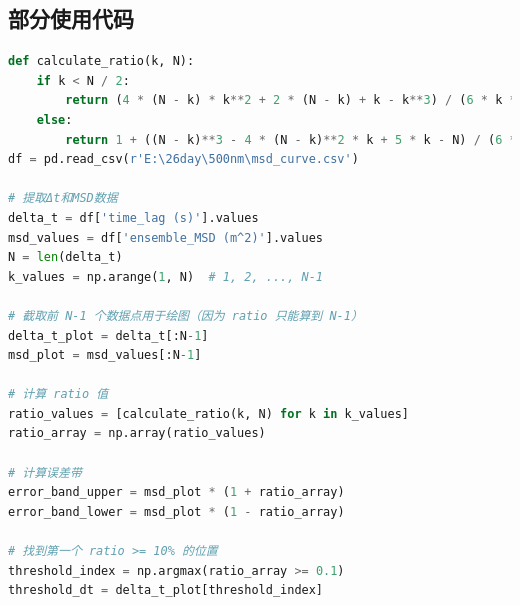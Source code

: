 \documentclass[a4paper]{report} %
\begin{document}
\subsection{部分使用代码}
\begin{lstlisting}[language=Python, caption=有效拟合区间的选取, label=code:calculate1]
def calculate_ratio(k, N):
    if k < N / 2:
        return (4 * (N - k) * k**2 + 2 * (N - k) + k - k**3) / (6 * k * (N - k)**2)
    else:
        return 1 + ((N - k)**3 - 4 * (N - k)**2 * k + 5 * k - N) / (6 * k**2 * (N - k))
df = pd.read_csv(r'E:\26day\500nm\msd_curve.csv')

# 提取Δt和MSD数据
delta_t = df['time_lag (s)'].values
msd_values = df['ensemble_MSD (m^2)'].values
N = len(delta_t)
k_values = np.arange(1, N)  # 1, 2, ..., N-1

# 截取前 N-1 个数据点用于绘图（因为 ratio 只能算到 N-1）
delta_t_plot = delta_t[:N-1]
msd_plot = msd_values[:N-1]

# 计算 ratio 值
ratio_values = [calculate_ratio(k, N) for k in k_values]
ratio_array = np.array(ratio_values)

# 计算误差带
error_band_upper = msd_plot * (1 + ratio_array)
error_band_lower = msd_plot * (1 - ratio_array)

# 找到第一个 ratio >= 10% 的位置
threshold_index = np.argmax(ratio_array >= 0.1)
threshold_dt = delta_t_plot[threshold_index]
\end{lstlisting}
\end{document}
